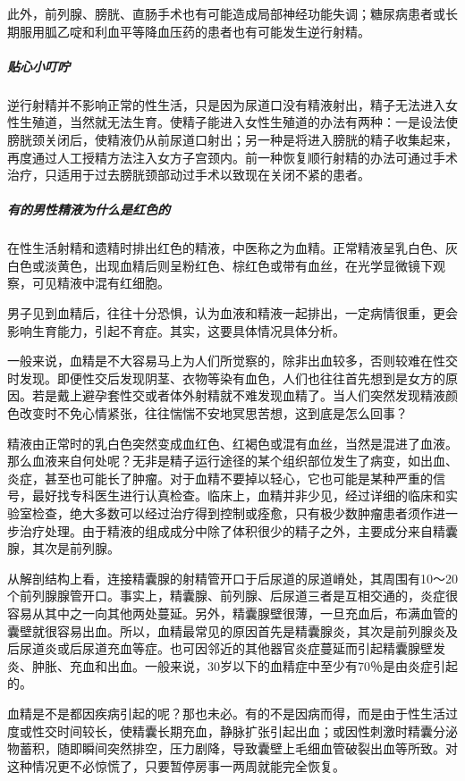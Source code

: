 此外，前列腺、膀胱、直肠手术也有可能造成局部神经功能失调；糖尿病患者或长期服用胍乙啶和利血平等降血压药的患者也有可能发生逆行射精。

\subparagraph{贴心小叮咛}

逆行射精并不影响正常的性生活，只是因为尿道口没有精液射出，精子无法进入女性生殖道，当然就无法生育。使精子能进入女性生殖道的办法有两种：一是设法使膀胱颈关闭后，使精液仍从前尿道口射出；另一种是将进入膀胱的精子收集起来，再度通过人工授精方法注入女方子宫颈内。前一种恢复顺行射精的办法可通过手术治疗，只适用于过去膀胱颈部动过手术以致现在关闭不紧的患者。

\subparagraph{有的男性精液为什么是红色的}

在性生活射精和遗精时排出红色的精液，中医称之为血精。正常精液呈乳白色、灰白色或淡黄色，出现血精后则呈粉红色、棕红色或带有血丝，在光学显微镜下观察，可见精液中混有红细胞。

男子见到血精后，往往十分恐惧，认为血液和精液一起排出，一定病情很重，更会影响生育能力，引起不育症。其实，这要具体情况具体分析。

一般来说，血精是不大容易马上为人们所觉察的，除非出血较多，否则较难在性交时发现。即便性交后发现阴茎、衣物等染有血色，人们也往往首先想到是女方的原因。若是戴上避孕套性交或者体外射精就不难发现血精了。当人们突然发现精液颜色改变时不免心情紧张，往往惴惴不安地冥思苦想，这到底是怎么回事？

精液由正常时的乳白色突然变成血红色、红褐色或混有血丝，当然是混进了血液。那么血液来自何处呢？无非是精子运行途径的某个组织部位发生了病变，如出血、炎症，甚至也可能长了肿瘤。对于血精不要掉以轻心，它也可能是某种严重的信号，最好找专科医生进行认真检查。临床上，血精并非少见，经过详细的临床和实验室检查，绝大多数可以经过治疗得到控制或痊愈，只有极少数肿瘤患者须作进一步治疗处理。由于精液的组成成分中除了体积很少的精子之外，主要成分来自精囊腺，其次是前列腺。

从解剖结构上看，连接精囊腺的射精管开口于后尿道的尿道嵴处，其周围有10～20个前列腺腺管开口。事实上，精囊腺、前列腺、后尿道三者是互相交通的，炎症很容易从其中之一向其他两处蔓延。另外，精囊腺壁很薄，一旦充血后，布满血管的囊壁就很容易出血。所以，血精最常见的原因首先是精囊腺炎，其次是前列腺炎及后尿道炎或后尿道充血等症。也可因邻近的其他器官炎症蔓延而引起精囊腺壁发炎、肿胀、充血和出血。一般来说，30岁以下的血精症中至少有70％是由炎症引起的。

血精是不是都因疾病引起的呢？那也未必。有的不是因病而得，而是由于性生活过度或性交时间较长，使精囊长期充血，静脉扩张引起出血；或因性刺激时精囊分泌物蓄积，随即瞬间突然排空，压力剧降，导致囊壁上毛细血管破裂出血等所致。对这种情况更不必惊慌了，只要暂停房事一两周就能完全恢复。

